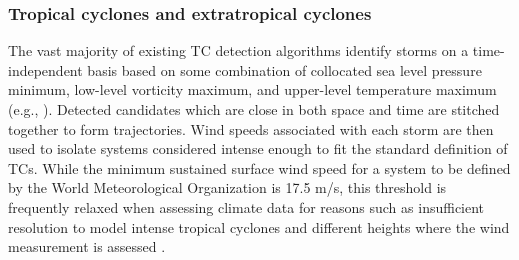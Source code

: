 \documentclass[11pt]{article}
\newcommand\citep{\cite}
\newcommand\citet{\cite}
\begin{document}
\subsubsection{Tropical cyclones and extratropical cyclones}



The vast majority of existing TC detection algorithms identify storms on a time-independent basis based on some combination of collocated sea level pressure minimum, low-level vorticity maximum, and upper-level temperature maximum (e.g., \citet{Vitart1997,Oouchi2006,Bengtsson2007a,Knutson2007,Walsh2007,Tory2013a,Zarzycki2014AMIPTCs}). Detected candidates which are close in both space and time are stitched together to form trajectories. Wind speeds associated with each storm are then used to isolate systems considered intense enough to fit the standard definition of TCs. While the minimum sustained surface wind speed for a system to be defined by the World Meteorological Organization is 17.5 m/s, this threshold is frequently {\color{blue}relaxed} when assessing climate data for reasons such as insufficient resolution to model intense tropical cyclones and different heights where the wind measurement is assessed \citep{Walsh2007}.
\end{document}
